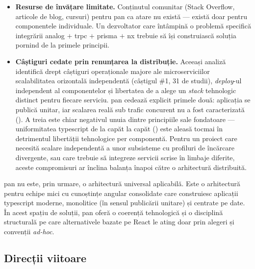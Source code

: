 \begin{itemize}
  \item \textbf{Resurse de învățare limitate.} Conținutul comunitar (Stack Overflow, articole de blog, cursuri) pentru \gls{pan} ca atare nu există --- există doar pentru componentele individuale. Un dezvoltator care întâmpină o problemă specifică integrării \gls{analog} \(+\) \gls{trpc} \(+\) \gls{prisma} \(+\) \gls{nx} trebuie să își construiască soluția pornind de la primele principii.

  \item \textbf{Câștiguri cedate prin renunțarea la distribuție.} Aceeași analiză~\cite{soldani2018} identifică drept câștiguri operaționale majore ale microserviciilor scalabilitatea orizontală independentă (câștigul \#1, 31 de studii), \textit{deploy}-ul independent al componentelor și libertatea de a alege un \textit{stack} tehnologic distinct pentru fiecare serviciu. \gls{pan} cedează explicit primele două: aplicația se publică unitar, iar scalarea reală sub trafic concurent nu a fost caracterizată (). A treia este chiar negativul unuia dintre principiile sale fondatoare --- uniformitatea \gls{typescript} de la capăt la capăt () este aleasă tocmai în detrimentul libertății tehnologice per componentă. Pentru un proiect care necesită scalare independentă a unor subsisteme cu profiluri de încărcare divergente, sau care trebuie să integreze servicii scrise în limbaje diferite, aceste compromisuri ar înclina balanța înapoi către o arhitectură distribuită.
\end{itemize}

\gls{pan} nu este, prin urmare, o arhitectură universal aplicabilă.
Este o arhitectură pentru echipe mici cu cunoștințe \gls{angular} consolidate care construiesc aplicații \gls{typescript} moderne, monolitice (în sensul publicării unitare) și centrate pe date.
În acest spațiu de soluții, \gls{pan} oferă o coerență tehnologică și o disciplină structurală pe care alternativele bazate pe React le ating doar prin alegeri și convenții \textit{ad-hoc}.

\subsection{Direcții viitoare}\label{sec:directii-viitoare}


